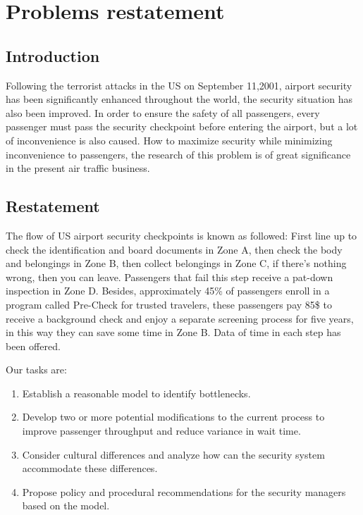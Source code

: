 
\section{Problems restatement}

\subsection{Introduction}
Following the terrorist attacks in the US on September 11,2001, airport security has been significantly enhanced throughout the world, the security situation has also been improved. In order to ensure the safety of all passengers, every passenger must pass the security checkpoint before entering the airport, but a lot of inconvenience is also caused. How to maximize security while minimizing inconvenience to passengers, the research of this problem is of great significance in the present air traffic business.

\subsection{Restatement}
The flow of US airport security checkpoints is known as followed: First line up to check the identification and board documents in Zone A, then check the body and belongings in Zone B, then collect belongings in Zone C, if there's nothing wrong, then you can leave. Passengers that fail this step receive a pat-down inspection in Zone D.
Besides, approximately 45\% of passengers enroll in a program called Pre-Check for trusted travelers, these passengers pay 85\$ to receive a background check and enjoy a separate screening process for five years, in this way they can save some time in Zone B. Data of time in each step has been offered.
\par
Our tasks are:
\begin{enumerate}
  \item Establish a reasonable model to identify bottlenecks.
  \item Develop two or more potential modifications to the current process to improve passenger throughput and reduce variance in wait time.
  \item Consider cultural differences and analyze how can the security system accommodate these differences.
  \item Propose policy and procedural recommendations for the security managers based on the model.
\end{enumerate}
